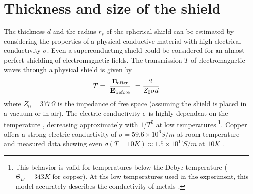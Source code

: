 \section{Thickness and size of the shield}\label{sec:5:shield-size}
The thickness $d$ and the radius $r_s$ of the spherical shield can be estimated by considering the properties of a physical conductive material with high electrical conductivity $\sigma$.
Even a superconducting shield could be considered for an almost perfect shielding of electromagnetic fields.
The transmission $T$ of electromagnetic waves through a physical shield is given by \cite{Vandenbosch_2022}
\begin{equation}
  T = \abs{\frac{\vec{E}_\mathrm{after}}{\vec{E}_\mathrm{before}}} = \frac{2}{Z_0 \sigma d}
\end{equation}
where $Z_0 = 377\si{\Omega}$ is the impedance of free space (assuming the shield is placed in a vacuum or in air).
The electric conductivity $\sigma$ is highly dependent on the temperature \cite[p. 284-286]{Gross_2018}, decreasing approximately with $1/T^5$ at low temperatures \footnote{This behavior is valid for temperatures below the Debye temperature ($\Theta_D = 343\si{K}$ for copper). At the low temperatures used in the experiment, this model accurately describes the conductivity of metals \cite{Berman_1952}.}.
Copper offers a strong electric conductivity of $\sigma = 59.6\times 10^6 \si{S/m}$ at room temperature and measured data showing even $\sigma(T = 10\si{K}) \approx 1.5\times 10^{10}\si{S/m}$ at $10\si{K}$ \cite{Berman_1952}.

